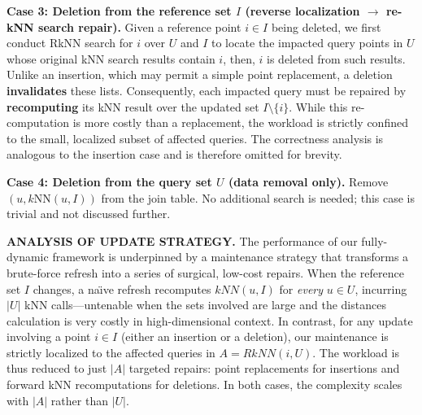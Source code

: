 \noindent\textbf{Case 3: Deletion from the reference set $I$ (reverse localization $\rightarrow$ re-kNN search repair).}
Given a reference point $i\in I$ being deleted, we first conduct RkNN search for $i$ over $U$ and $I$ to locate the impacted query points in $U$ whose original kNN search results contain $i$, then, $i$ is deleted from such results. Unlike an insertion, which may permit a simple point replacement, a deletion \textbf{invalidates} these lists. Consequently, each impacted query must be repaired by \textbf{recomputing} its kNN result over the updated set $I \setminus \{i\}$. While this re-computation is more costly than a replacement, the workload is strictly confined to the small, localized subset of affected queries. The correctness analysis is analogous to the insertion case and is therefore omitted for brevity.

\noindent \textbf{Case 4: Deletion from the query set $U$ (data removal only).}
Remove $(u, k\mathrm{NN}(u,I))$ from the join table. No additional search is needed; this case is trivial and not discussed further.


\noindent\textbf{ANALYSIS OF UPDATE STRATEGY.} The performance of our fully-dynamic framework is underpinned by a maintenance strategy that transforms a brute-force refresh into a series of surgical, low-cost repairs. When the reference set $I$ changes, a na\"{\i}ve refresh recomputes $kNN(u,I)$ for \emph{every} $u\in U$, incurring $|U|$ kNN calls---untenable when the sets involved are large and the distances calculation is very costly in high-dimensional context. In contrast, for any update involving a point $i \in I$ (either an insertion or a deletion), our maintenance is strictly localized to the affected queries in $A=RkNN(i, U)$. The workload is thus reduced to just $|A|$ targeted repairs: point replacements for insertions and forward kNN recomputations for deletions. In both cases, the complexity scales with $|A|$ rather than $|U|$.

